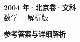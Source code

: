 \documentclass[zihao=-4, a4paper]{ctexart}
\begin{document}
\begin{center}
  {\Large\bfseries 2004 年·北京卷·文科}\\[4pt]
  {\large 数学 · 解析版}
\end{center}
\medskip
{}

\clearpage
{}
\begin{center}{\Large\bfseries 参考答案与详细解析}\end{center}
\medskip

\end{document}
